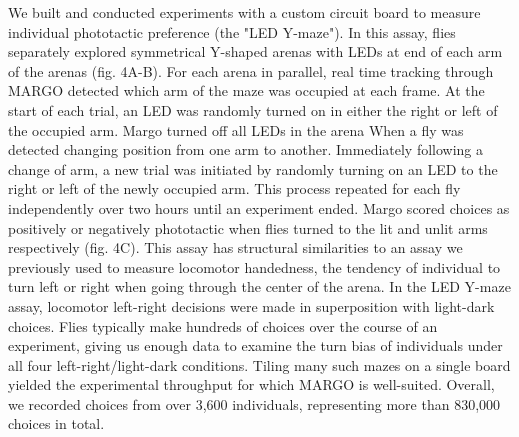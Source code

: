 \documentclass[10pt]{article}
\begin{document}
\begin{multicols}{2}
We built and conducted experiments with a custom circuit board to measure individual phototactic preference (the "LED Y-maze"). In this assay, flies separately explored symmetrical Y-shaped arenas with LEDs at end of each arm of the arenas (fig. 4A-B). For each arena in parallel, real time tracking through MARGO detected which arm of the maze was occupied at each frame. At the start of each trial, an LED was randomly turned on in either the right or left  of the occupied arm. Margo turned off all LEDs in the arena When a fly was detected changing position from one arm to another. Immediately following a change of arm, a new trial was initiated by randomly turning on an LED to the right or left of the newly occupied arm. This process repeated for each fly independently over two hours until an experiment ended. Margo scored choices as positively or negatively phototactic when flies turned to the lit and unlit arms respectively (fig. 4C). This assay has structural similarities to an assay we previously used to measure locomotor handedness, the tendency of individual to turn left or right when going through the center of the arena. In the LED Y-maze assay, locomotor left-right decisions were made in superposition with light-dark choices. Flies typically make hundreds of choices over the course of an experiment, giving us enough data to examine the turn bias of individuals under all four left-right/light-dark conditions. Tiling many such mazes on a single board yielded the experimental throughput for which MARGO is well-suited. Overall, we recorded choices from over 3,600 individuals, representing more than 830,000 choices in total.


\end{multicols}
\end{document}
